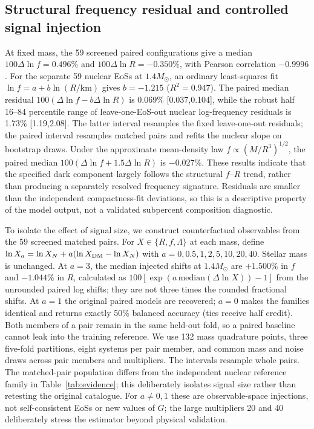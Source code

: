 \documentclass[11pt,a4paper]{article}
\newcommand{\Msun}{M_\odot}
\begin{document}
\subsection{Structural frequency residual and controlled signal injection}
At fixed mass, the 59 screened paired configurations give a median $100\Delta\ln f=0.496\%$ and $100\Delta\ln R=-0.350\%$, with Pearson correlation $-0.9996$. For the separate 59 nuclear EoSs at $1.4\Msun$, an ordinary least-squares fit $\ln f=a+b\ln(R/\mathrm{km})$ gives $b=-1.215$ ($R^2=0.947$). The paired median residual $100(\Delta\ln f-b\Delta\ln R)$ is 0.069\% [0.037,0.104], while the robust half 16--84 percentile range of leave-one-EoS-out nuclear log-frequency residuals is 1.73\% [1.19,2.08]. The latter interval resamples the fixed leave-one-out residuals; the paired interval resamples matched pairs and refits the nuclear slope on bootstrap draws. Under the approximate mean-density law $f\propto(M/R^3)^{1/2}$, the paired median $100(\Delta\ln f+1.5\Delta\ln R)$ is $-0.027\%$. These results indicate that the specified dark component largely follows the structural $f$--$R$ trend, rather than producing a separately resolved frequency signature. Residuals are smaller than the independent compactness-fit deviations, so this is a descriptive property of the model output, not a validated subpercent composition diagnostic.

To isolate the effect of signal size, we construct counterfactual observables from the 59 screened matched pairs. For $X\in\{R,f,\Lambda\}$ at each mass, define $\ln X_a=\ln X_N+a(\ln X_{\rm DM}-\ln X_N)$ with $a=0,0.5,1,2,5,10,20,40$. Stellar mass is unchanged. At $a=3$, the median injected shifts at $1.4\Msun$ are $+1.500\%$ in $f$ and $-1.044\%$ in $R$, calculated as $100[\exp(a\,\mathrm{median}(\Delta\ln X))-1]$ from the unrounded paired log shifts; they are not three times the rounded fractional shifts. At $a=1$ the original paired models are recovered; $a=0$ makes the families identical and returns exactly 50\% balanced accuracy (ties receive half credit). Both members of a pair remain in the same held-out fold, so a paired baseline cannot leak into the training reference. We use 132 mass quadrature points, three five-fold partitions, eight systems per pair member, and common mass and noise draws across pair members and multipliers. The intervals resample whole pairs. The matched-pair population differs from the independent nuclear reference family in Table~\ref{tab:evidence}; this deliberately isolates signal size rather than retesting the original catalogue. For $a\ne0,1$ these are observable-space injections, not self-consistent EoSs or new values of $G$; the large multipliers 20 and 40 deliberately stress the estimator beyond physical validation.
\end{document}

